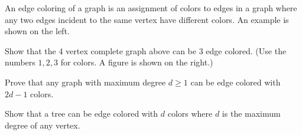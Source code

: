 \documentclass[11pt]{article}
\begin{document}

An edge coloring of a graph is an assignment of colors to edges in a graph where any two edges incident to the same vertex have different colors. An example is shown on the left.

\begin{center}
\end{center}

\begin{Parts}
\Part Show that the 4 vertex complete graph above can be 3 edge colored. (Use the numbers $1,2,3$ for colors. A figure is shown on the right.)





\Part Prove that any graph with maximum degree $d \geq 1$ can be edge colored with $2d-1$ colors. 



\Part Show that a tree can be edge colored with $d$ colors where $d$ is the maximum degree of any vertex.

\end{Parts}
\end{document}
